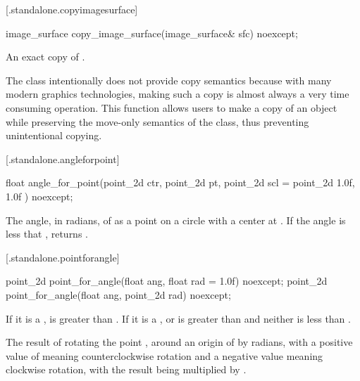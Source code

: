  [\iotwod.standalone.copyimagesurface] {}

%
\begin{itemdecl}
image_surface copy_image_surface(image_surface& sfc) noexcept;
\end{itemdecl}
\begin{itemdescr}
\pnum
\returns
An exact copy of .

\pnum
\begin{note}
The  class intentionally does not provide copy semantics because with many modern graphics technologies, making such a copy is almost always a very time consuming operation. This function allows users to make a copy of an  object while preserving the move-only semantics of the  class, thus preventing unintentional copying.
\end{note}
\end{itemdescr}

 [\iotwod.standalone.angleforpoint] {}

%
\begin{itemdecl}
float angle_for_point(point_2d ctr, point_2d pt,
  point_2d scl = point_2d{ 1.0f, 1.0f }) noexcept;
\end{itemdecl}
\begin{itemdescr}
\pnum
\returns
The angle, in radians, of  as a point on a circle with a center at . If the angle is less that , returns .
\end{itemdescr}

 [\iotwod.standalone.pointforangle] {}

%
\begin{itemdecl}
point_2d point_for_angle(float ang, float rad = 1.0f) noexcept;
point_2d point_for_angle(float ang, point_2d rad) noexcept;
\end{itemdecl}
\begin{itemdescr}
\pnum
\requires
If it is a ,  is greater than . If it is a ,  or  is greater than  and neither is less than .

\pnum
\returns
The result of rotating the point , around an origin of  by  radians, with a positive value of  meaning counterclockwise rotation and a negative value meaning clockwise rotation, with the result being multiplied by .
\end{itemdescr}

